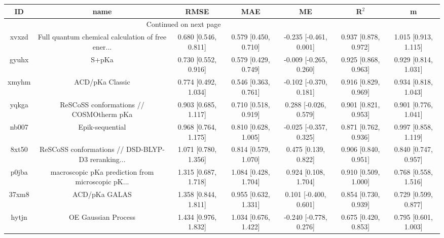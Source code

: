 \documentclass{article}
\begin{document}
\begin{center}
\begin{longtable}{|ccccccc|}
\toprule
    ID &                                               name &                  RMSE &                   MAE &                       ME &                 R$^2$ &                      m \\
\midrule
\endhead
\midrule
\multicolumn{3}{r}{{Continued on next page}} \\
\midrule
\endfoot

\bottomrule
\endlastfoot
 xvxzd &  Full quantum chemical calculation of free ener... &  0.680 [0.546, 0.811] &  0.579 [0.450, 0.710] &   -0.235 [-0.461, 0.001] &  0.937 [0.878, 0.972] &   1.015 [0.913, 1.115] \\
 gyuhx &                                              S+pKa &  0.730 [0.552, 0.916] &  0.579 [0.429, 0.749] &   -0.009 [-0.265, 0.260] &  0.925 [0.868, 0.963] &   0.929 [0.814, 1.031] \\
 xmyhm &                                    ACD/pKa Classic &  0.774 [0.492, 1.034] &  0.546 [0.363, 0.761] &   -0.102 [-0.370, 0.181] &  0.916 [0.829, 0.969] &   0.934 [0.818, 1.043] \\
 yqkga &            ReSCoSS conformations // COSMOtherm pKa &  0.903 [0.685, 1.117] &  0.710 [0.518, 0.919] &    0.288 [-0.026, 0.579] &  0.901 [0.821, 0.953] &   0.901 [0.776, 1.041] \\
 nb007 &                                    Epik-sequential &  0.968 [0.764, 1.175] &  0.810 [0.628, 1.005] &   -0.025 [-0.357, 0.325] &  0.871 [0.762, 0.936] &   0.997 [0.858, 1.119] \\
 8xt50 &  ReSCoSS conformations // DSD-BLYP-D3 reranking... &  1.071 [0.780, 1.356] &  0.814 [0.579, 1.070] &     0.475 [0.139, 0.822] &  0.906 [0.840, 0.951] &   0.840 [0.747, 0.957] \\
 p0jba &  macroscopic pKa prediction from microscopic pK... &  1.315 [0.687, 1.718] &  1.084 [0.428, 1.704] &     0.924 [0.108, 1.704] &  0.910 [0.509, 1.000] &   0.768 [0.558, 1.516] \\
 37xm8 &                                      ACD/pKa GALAS &  1.358 [0.844, 1.811] &  0.955 [0.632, 1.331] &    0.101 [-0.400, 0.601] &  0.854 [0.730, 0.939] &   0.729 [0.599, 0.877] \\
 hytjn &                                OE Gaussian Process &  1.434 [0.976, 1.832] &  1.034 [0.676, 1.422] &   -0.240 [-0.778, 0.276] &  0.675 [0.420, 0.853] &   0.795 [0.601, 1.003] \\

\end{longtable}
\end{center}
\end{document}
